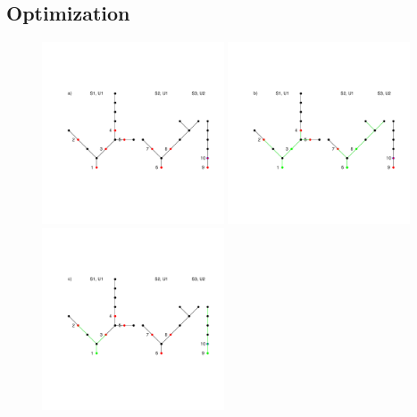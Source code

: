 \documentclass[12pt]{elsarticle}
\begin{document}

\subsection{Optimization \label{sec:opt}}

\begin{figure}
\includegraphics[width=0.48\textwidth]{figures/opt_s.pdf}
\includegraphics[width=0.48\textwidth]{figures/opt_h.pdf}
\includegraphics[width=0.48\textwidth]{figures/opt_e.pdf}

\end{figure}
\end{document}
